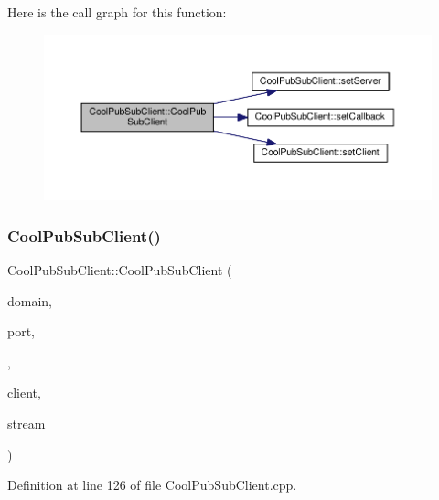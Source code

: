 Here is the call graph for this function\+:\nopagebreak
\begin{figure}[H]
\begin{center}
\leavevmode
\includegraphics[width=350pt]{class_cool_pub_sub_client_a2aea0a9487dc15b9db1caf0f069eb877_cgraph}
\end{center}
\end{figure}
\mbox{\label{class_cool_pub_sub_client_a6466f55abe5820d410b1c9cf7a70ec7e}} 
\subsubsection{\texorpdfstring{Cool\+Pub\+Sub\+Client()}{CoolPubSubClient()}\hspace{0.1cm}{\footnotesize\ttfamily [14/14]}}
{\footnotesize\ttfamily Cool\+Pub\+Sub\+Client\+::\+Cool\+Pub\+Sub\+Client (\begin{DoxyParamCaption}\item[{const char $\ast$}]{domain,  }\item[{uint16\+\_\+t}]{port,  }\item[{\hyperlink{class_cool_pub_sub_client_a021ec75e9fbaf658370b8005ccfddc14}{M\+Q\+T\+T\+\_\+\+C\+A\+L\+L\+B\+A\+C\+K\+\_\+\+S\+I\+G\+N\+A\+T\+U\+RE}}]{,  }\item[{Client \&}]{client,  }\item[{Stream \&}]{stream }\end{DoxyParamCaption})}



Definition at line 126 of file Cool\+Pub\+Sub\+Client.\+cpp.


